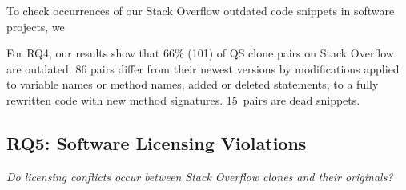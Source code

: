 \documentclass[10pt,journal,compsoc]{IEEEtran}
\newenvironment{boxquote}{\vspace{-1ex}\setlength{\FrameSep}{1\fboxsep}\begin{framed}\setlength{\parskip}{0.5\baselineskip}\setlength{\parindent}{0pt}}{\end{framed}}
\begin{document}
To check occurrences of our Stack Overflow outdated code snippets in software projects, 
we 

\begin{boxquote}
For RQ4, our results show that 66\% (101) of QS clone pairs on Stack
Overflow are outdated. 86 pairs differ from their newest versions by
modifications applied to variable names or method names, added or deleted
statements, to a fully rewritten code with new method signatures. 15~pairs are
dead snippets.
\end{boxquote}

\subsection{RQ5: Software Licensing Violations}
\vspace{0.25cm}
\textit{Do
	licensing conflicts occur between Stack Overflow clones and their
	originals?}
\vspace{0.25cm}
\end{document}
